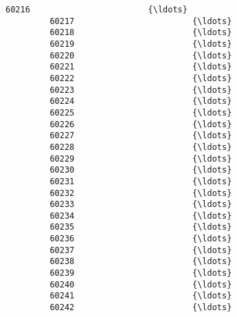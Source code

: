 \documentclass[11pt]{article}
\begin{document}
\begin{Verbatim}[commandchars=\\\{\}]
         60216                        {\ldots}                           
         60217                        {\ldots}                           
         60218                        {\ldots}                           
         60219                        {\ldots}                           
         60220                        {\ldots}                           
         60221                        {\ldots}                           
         60222                        {\ldots}                           
         60223                        {\ldots}                           
         60224                        {\ldots}                           
         60225                        {\ldots}                           
         60226                        {\ldots}                           
         60227                        {\ldots}                           
         60228                        {\ldots}                           
         60229                        {\ldots}                           
         60230                        {\ldots}                           
         60231                        {\ldots}                           
         60232                        {\ldots}                           
         60233                        {\ldots}                           
         60234                        {\ldots}                           
         60235                        {\ldots}                           
         60236                        {\ldots}                           
         60237                        {\ldots}                           
         60238                        {\ldots}                           
         60239                        {\ldots}                           
         60240                        {\ldots}                           
         60241                        {\ldots}                           
         60242                        {\ldots}                           
         

\end{Verbatim}
\end{document}
